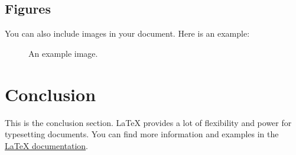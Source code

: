 \documentclass{article}
\begin{document}
\subsection{Figures}

You can also include images in your document. Here is an example:
\begin{figure}[h]
    \centering
    \caption{An example image.}
    \label{fig:example}
\end{figure}

\section{Conclusion}

This is the conclusion section. LaTeX provides a lot of flexibility and power for typesetting documents. You can find more information and examples in the \href{https://www.latex-project.org}{LaTeX documentation}.
\end{document}

